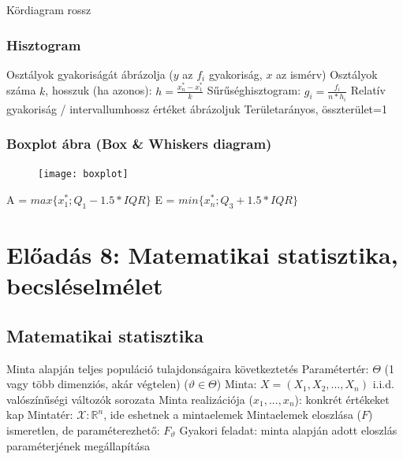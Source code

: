 \documentclass[12pt,a4paper]{article}
\begin{document}
\begin{outline}
	\1 Kördiagram rossz
\end{outline}

\subsubsection{Hisztogram}

\begin{outline}
	\1 Osztályok gyakoriságát ábrázolja ($y$ az $f_i$ gyakoriság, $x$ az ismérv)
	\1 Osztályok száma $k$, hosszuk (ha azonos): $h = \frac{x^*_n - x^*_1}{k}$
	\1 Sűrűséghisztogram: $g_i = \frac{f_i}{n*h_i}$
		\2 Relatív gyakoriság / intervallumhossz értéket ábrázoljuk
		\2 Területarányos, összterület=1
\end{outline}

\subsubsection{Boxplot ábra (Box \& Whiskers diagram)}

\begin{figure}[h!]
	\centering
	\texttt{[image: boxplot]}
\end{figure}

\begin{outline}
	\1 A = $max\{ x^*_1; Q_1 - 1.5 * IQR \}$
	\1 E = $min\{ x^*_n; Q_3 + 1.5 * IQR \}$
\end{outline}

\pagebreak

\section{Előadás 8: Matematikai statisztika, becsléselmélet}

\subsection{Matematikai statisztika}

\begin{outline}
	\1 Minta alapján teljes populáció tulajdonságaira következtetés
	\1 Paramétertér: $\Theta$ (1 vagy több dimenziós, akár végtelen) ($\vartheta \in \Theta$)
	\1 Minta: $X = (X_1, X_2, ..., X_n)$ i.i.d. valószínűségi változók sorozata
		\2 Minta realizációja ($x_1,...,x_n$): konkrét értékeket kap
	\1 Mintatér: $\mathcal{X} : \mathbb{R}^n$, ide eshetnek a mintaelemek
	\1 Mintaelemek eloszlása ($F$) ismeretlen, de paraméterezhető: $F_\vartheta$
	\1 Gyakori feladat: minta alapján adott eloszlás paraméterjének megállapítása
\end{outline}
\end{document}
